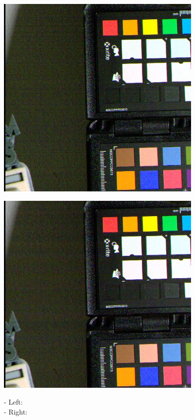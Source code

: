 \begin{center}
\includegraphics[height=10cm]{images/10ms+4-crop}
\end{center}

\begin{center}
\includegraphics[height=10cm]{images/10ms+4-fixrn-crop}
\end{center}

- Left:  \\
- Right:  \\


